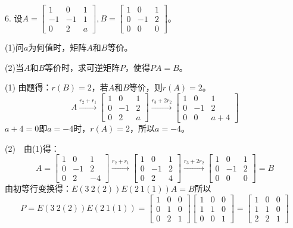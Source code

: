 \documentclass{article}
\begin{document}
6. 设$A=
\begin{bmatrix}
  1 & 0 & 1\\
  -1 & -1 & 1\\
  0 & 2 & a
\end{bmatrix},
B=
\begin{bmatrix}
  1 & 0 & 1\\
  0 & -1 & 2\\
   0 & 0 & 0
\end{bmatrix}
$。

(1)问$a$为何值时，矩阵$A$和$B$等价。

(2)当$A$和$B$等价时，求可逆矩阵$P$，使得$PA=B$。

\begin{jie}
(1)
由题得：$r(B)=2$，若$A$和$B$等价，则$r(A)=2$。
\begin{equation*}
 A\xrightarrow{r_{2}+ r_{1}}
{
\begin{bmatrix}
  1 & 0 & 1\\
  0 & -1 & 2\\
  0 & 2 & a
\end{bmatrix}
}\xrightarrow{r_{3}+2r_{2}}
{
\begin{bmatrix}
  1 & 0 & 1\\
  0 & -1 & 2\\
  0 & 0 & a+4
\end{bmatrix}
}
\end{equation*}
$a+4=0$即$a=-4$时，$r(A)=2$，所以$a=-4$。

(2)~~由(1)得：
\begin{equation*}A=
  \begin{bmatrix}
  1 & 0 & 1\\
  0 & -1 & 2\\
  0 & 2 & -4
  \end{bmatrix}\xrightarrow{r_{2}+r_{1}}
{
\begin{bmatrix}
  1 & 0 & 1\\
  0 & -1 & 2\\
  0 & 2 & 4
\end{bmatrix}
}\xrightarrow{r_{3}+2r_{2}}
{
\begin{bmatrix}
  1 & 0 & 1\\
  0 & -1 & 2\\
  0 & 0 & 0
\end{bmatrix}
}=B
\end{equation*}
由初等行变换得：$E(3~2(2))E(2~1(1))A=B$所以
\begin{equation*}
P=E(3~2(2))E(2~1(1))=
  \begin{bmatrix}
    1 & 0 & 0\\
    0 & 1& 0\\
    0 & 2& 1
  \end{bmatrix}
   \begin{bmatrix}
    1 & 0 & 0\\
    1 & 1& 0\\
    0 & 0& 1
  \end{bmatrix}=
   \begin{bmatrix}
    1 & 0 & 0\\
    1 & 1& 0\\
    2 & 2& 1
  \end{bmatrix}
\end{equation*}
\end{jie}
\end{document}
